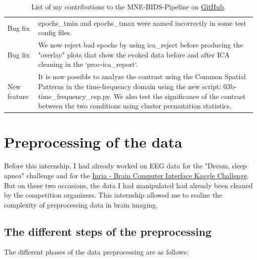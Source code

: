 \begin{table}[ht]
\begin{tabular}{@{}| p{3cm}|p{9cm}| @{}}
        Bug fix          & epochs\_tmin and epochs\_tmax were named incorrectly in some test config files.                                                                                                                                                                                             \\
        Bug fix          & We now reject bad epochs by using ica\_reject before producing the "overlay" plots that show the evoked data before and after ICA cleaning in the `proc-ica\_report`.                                                                                                       \\
        New feature      & It is now possible to analyze the contrast using the Common Spatial Patterns in the time-frequency domain using the new script: 03b-time\_frequency\_csp.py. We also test the significance of the contrast between the two conditions using cluster permutation statistics. \\
        \hline
    \end{tabular}

    \caption[List of my contributions to the MNE-BIDS-Pipeline.]%
    {List of my contributions to the MNE-BIDS-Pipeline on \href{https://raw.githubusercontent.com/mne-tools/MNE-BIDS-Pipeline/main/docs/source/changes.md}{GitHub}.}
    \label{Tab:PR}
\end{table}

\section{Preprocessing of the data}

Before this internship, I had already worked on EEG data for the "Dream, sleep apnea" challenge and for the \href{https://github.com/crsegerie/bci_competition}{Inria - Brain Computer Interface Kaggle Challenge}. But on these two occasions, the data I had manipulated had already been cleaned by the competition organizers. This internship allowed me to realize the complexity of preprocessing data in brain imaging.

\subsection{The different steps of the preprocessing}

The different phases of the data preprocessing are as follows:

